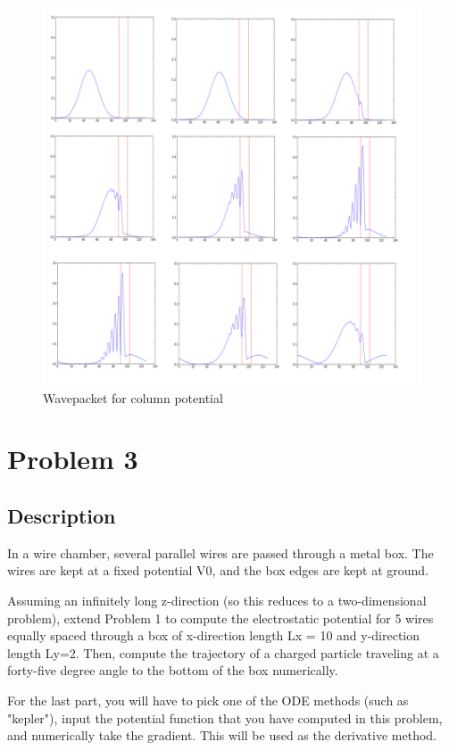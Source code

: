 \documentclass[11pt,letterpaper]{article}
\begin{document}
\begin{figure}
\begin{center}
\includegraphics[width=0.8\linewidth,angle=0]{c.png}
\caption{Wavepacket for column potential}
\label{figure4}
\end{center}
\end{figure}

  
\section{Problem 3}
\subsection{Description}
In a wire chamber, several parallel wires are passed through a metal box. The wires are kept at a fixed potential V0, and the box edges are kept at ground. 

Assuming an infinitely long z-direction (so this reduces to a two-dimensional problem), extend Problem 1 to compute the electrostatic potential for 5 wires equally spaced through a box of x-direction length Lx = 10 and y-direction length Ly=2. 
Then, compute the trajectory of a charged particle traveling at a forty-five degree angle to the bottom of the box numerically. 

For the last part, you will have to pick one of the ODE methods (such as "kepler"), input the potential function that you have computed in this problem, and numerically take the gradient. This will be used as the derivative method. 
\end{document}
